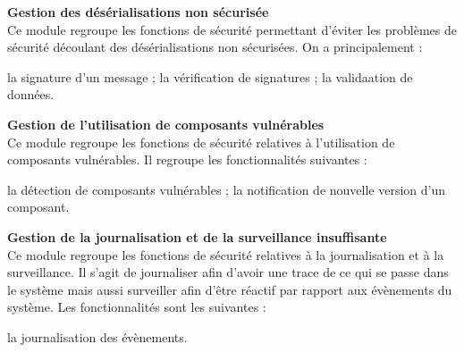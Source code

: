\textbf{\RIGHTarrow Gestion des désérialisations non sécurisée}\\
Ce module regroupe les fonctions de sécurité permettant d'éviter les problèmes de sécurité découlant des désérialisations non sécurisées. On a principalement :
\begin{itemize}
	\itemcheck la signature d'un message ;
	\itemcheck la vérification de signatures ; 
	\itemcheck la validaation de données.\\
\end{itemize}

\textbf{\RIGHTarrow Gestion de l'utilisation de composants vulnérables}\\
Ce module regroupe les fonctions de sécurité relatives à l'utilisation de composants vulnérables. Il regroupe les fonctionnalités suivantes :
\begin{itemize}
	\itemcheck la détection de composants vulnérables ;
	\itemcheck la notification de nouvelle version d'un composant.\\
\end{itemize}

\textbf{\RIGHTarrow Gestion de la journalisation et de la surveillance insuffisante}\\
Ce module regroupe les fonctions de sécurité relatives à la journalisation et à la surveillance. Il s'agit de journaliser afin d'avoir une trace de ce qui se passe dans le système mais aussi surveiller afin d'être réactif par rapport aux évènements du système. Les fonctionnalités sont les suivantes :
\begin{itemize}
	\itemcheck la journalisation des évènements.
\end{itemize}

